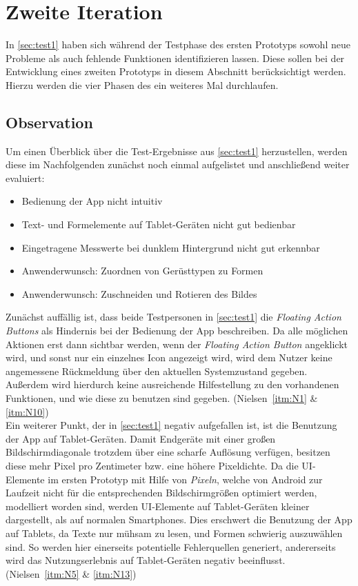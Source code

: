 \chapter{Zweite Iteration}\label{chap:pro2}
In \autoref{sec:test1} haben sich während der Testphase des ersten Prototyps sowohl neue Probleme als auch fehlende Funktionen identifizieren lassen.
Diese sollen bei der Entwicklung eines zweiten Prototyps in diesem Abschnitt berücksichtigt werden. 
Hierzu werden die vier Phasen des \hcdp{} ein weiteres Mal durchlaufen.

\section{Observation}
Um einen Überblick über die Test-Ergebnisse aus \autoref{sec:test1} herzustellen, werden diese im Nachfolgenden zunächst noch einmal aufgelistet und anschließend weiter evaluiert:

\begin{itemize}
  \item Bedienung der App nicht intuitiv
  \item Text- und Formelemente auf Tablet-Geräten nicht gut bedienbar
  \item Eingetragene Messwerte bei dunklem Hintergrund nicht gut erkennbar
  \item Anwenderwunsch: Zuordnen von Gerüsttypen zu Formen
  \item Anwenderwunsch: Zuschneiden und Rotieren des Bildes
\end{itemize}

\noindent
Zunächst auffällig ist, dass beide Testpersonen in \autoref{sec:test1} die \emph{Floating Action Buttons} als Hindernis bei der Bedienung der App beschreiben.
Da alle möglichen Aktionen erst dann sichtbar werden, wenn der \emph{Floating Action Button} angeklickt wird, und sonst nur ein einzelnes Icon angezeigt wird, wird dem Nutzer keine angemessene Rückmeldung über den aktuellen Systemzustand gegeben.
Außerdem wird hierdurch keine ausreichende Hilfestellung zu den vorhandenen Funktionen, und wie diese zu benutzen sind gegeben.
(Nielsen~\autoref{itm:N1} \& \autoref{itm:N10}) \\

Ein weiterer Punkt, der in \autoref{sec:test1} negativ aufgefallen ist, ist die Benutzung der App auf Tablet-Geräten.
Damit Endgeräte mit einer großen Bildschirmdiagonale trotzdem über eine scharfe Auflösung verfügen, besitzen diese mehr Pixel pro Zentimeter bzw. eine höhere Pixeldichte.
Da die UI-Elemente im ersten Prototyp mit Hilfe von \emph{Pixeln}, welche von Android zur Laufzeit nicht für die entsprechenden Bildschirmgrößen optimiert werden, modelliert worden sind, werden UI-Elemente auf Tablet-Geräten kleiner dargestellt, als auf normalen Smartphones.
Dies erschwert die Benutzung der App auf Tablets, da Texte nur mühsam zu lesen, und Formen schwierig auszuwählen sind.
So werden hier einerseits potentielle Fehlerquellen generiert, andererseits wird das Nutzungserlebnis auf Tablet-Geräten negativ beeinflusst.
(Nielsen~\autoref{itm:N5} \& \autoref{itm:N13}) \\

